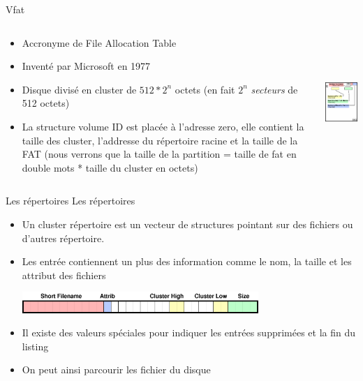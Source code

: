 \begin{frame}[fragile=singleslide]{Vfat}
  \begin{columns}
    \begin{column}{7cm}
  \begin{itemize}
  \item Accronyme de File Allocation Table
  \item Inventé par Microsoft en 1977
  \item Disque divisé en cluster de  $512 * 2^n$ octets (en fait $2^n$
    \emph{secteurs} de 512 octets)
  \item  La structure  volume ID  est  placée à  l'adresse zero,  elle
    contient la taille des cluster, l'addresse du répertoire racine et
    la taille de la FAT (nous  verrons que la taille de la partition =
    taille de fat en double mots * taille du cluster en octets)
  \end{itemize}
    \end{column}
    \begin{column}{5cm}
      \includegraphics[height=5cm]{pics/volume_id}
    \end{column}
  \end{columns}
\end{frame}

\begin{frame}[fragile=singleslide]{Les répertoires}
  Les répertoires
  \begin{itemize}
  \item Un cluster répertoire  est un vecteur de structures pointant
    sur des fichiers ou d'autres répertoire.
  \item Les entrée contiennent un plus des information comme le nom,
    la taille et les attribut des fichiers
    \begin{center}
      \includegraphics[height=0.8cm]{pics/dir_entry_short}
    \end{center}
  \item Il  existe des valeurs  spéciales pour indiquer  les entrées
    supprimées et la fin du listing
  \item On peut ainsi parcourir les fichier du disque
  \end{itemize}
\end{frame}

